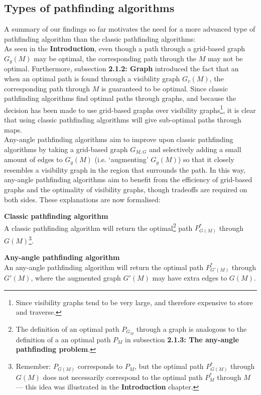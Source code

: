 \documentclass[12pt,notitlepage]{report}
\begin{document}
\subsection {Types of pathfinding algorithms}

A summary of our findings so far motivates the need for a more advanced type of pathfinding algorithm than the classic pathfinding algorithms:\\

\noindent
As seen in the {\bfseries Introduction}, even though a path through a grid-based graph $G_{g}(M)$ may be optimal, the corresponding path through the $M$ may not be optimal. Furthermore, subsection {\bfseries 2.1.2: Graph} introduced the fact that an when an optimal path is found through a visibility graph $G_{v}(M)$, the corresponding path through $M$ is guaranteed to be optimal. Since classic pathfinding algorithms find optimal paths through graphs, and because the decision has been made to use grid-based graphs over visibility graphs\footnote{Since visibility graphs tend to be very large, and therefore expensive to store and traverse.}, it is clear that using classic pathfinding algorithms will give sub-optimal paths through maps.\\

\noindent
Any-angle pathfinding algorithms aim to improve upon classic pathfinding algorithms by taking a grid-based graph $G_{M,G}$ and selectively adding a small amount of edges to $G_{g}(M)$ (i.e. `augmenting' $G_{g}(M)$) so that it closely resembles a visibility graph in the region that surrounds the path. In this way, any-angle pathfinding algorithms aim to benefit from the efficiency of grid-based graphs and the optimality of visibility graphs, though tradeoffs are required on both sides. These explanations are now formalised:

\begin{description}
\item{\bfseries Classic pathfinding algorithm}\\ 
A classic pathfinding algorithm will return the optimal\footnote{The definition of an optimal path $P_{G_{M}}$ through a graph is analogous to the definition of a an optimal path $P_{M}$ in subsection {\bfseries 2.1.3: The any-angle pathfinding problem}.}  path $P^{*}_{G(M)}$ through $G(M)$\footnote{Remember: $P_{G(M)}$ corresponds to $P_{M}$, but the optimal path $P^{*}_{G(M)}$ through $G(M)$ does not necessarily correspond to the optimal path $P^{*}_{M}$ through $M$ --- this idea was illustrated in the {\bfseries Introduction} chapter.}.
\item{\bfseries Any-angle pathfinding algorithm}\\
An any-angle pathfinding algorithm will return the optimal path $P^{*}_{G'(M)}$ through $G'(M)$, where the augmented graph $G'(M)$ may have extra edges to $G(M)$.
\end{description}
\end{document}
